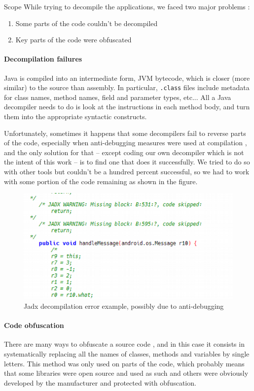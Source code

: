 \begin{chaptercover}{Scope}
\vspace{1cm}
While trying to decompile the applications, we faced two major problems :

\begin{enumerate}
  \item Some parts of the code couldn’t be decompiled
  \item Key parts of the code were obfuscated
\end{enumerate}

\paragraph{Decompilation failures} Java is compiled into an intermediate form, JVM bytecode, which is closer (more similar) to the source than assembly. In particular, \texttt{.class} files include metadata for class names, method names, field and parameter types, etc... All a Java decompiler needs to do is look at the instructions in each method body, and turn them into the appropriate syntactic constructs.

Unfortunately, sometimes it happens that some decompilers fail to reverse parts of the code, especially when anti-debugging measures were used at compilation \cite{anti-debugging}, and the only solution for that -- except coding our own decompiler which is not the intent of this work -- is to find one that does it successfully. We tried to do so with other tools but couldn’t be a hundred percent successful, so we had to work with some portion of the code remaining as shown in the figure.

\begin{figure}[H]
  \centering
  \includegraphics[width=.5\linewidth]{figures/jadx-decompilation-error}
  \caption{Jadx decompilation error example, possibly due to anti-debugging}
\end{figure}

\paragraph{Code obfuscation} There are many ways to obfuscate a source code \cite{code-obfuscation}, and in this case it consists in systematically replacing all the names of classes, methods and variables by single letters. This method was only used on parts of the code, which probably means that some libraries were open source and used as such and others were obviously developed by the manufacturer and protected with obfuscation.


\end{chaptercover}
